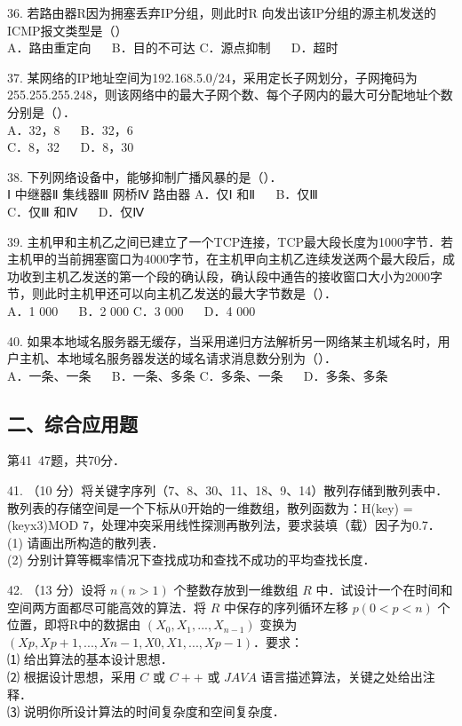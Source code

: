 36. 若路由器R因为拥塞丢弃IP分组，则此时R 向发出该IP分组的源主机发送的ICMP报文类型是（） \\
A．路由重定向 $\quad$ B．目的不可达
C．源点抑制 $\quad$ D．超时

37. 某网络的IP地址空间为192.168.5.0/24，采用定长子网划分，子网掩码为255.255.255.248，则该网络中的最大子网个数、每个子网内的最大可分配地址个数分别是（）．  \\
A．32，8 $\quad$ B．32，6 \\
C．8，32 $\quad$ D．8，30

38. 下列网络设备中，能够抑制广播风暴的是（）． \\
Ⅰ 中继器Ⅱ 集线器Ⅲ 网桥Ⅳ 路由器
A．仅Ⅰ 和Ⅱ $\quad$ B．仅Ⅲ \\
C．仅Ⅲ 和Ⅳ $\quad$ D．仅Ⅳ

39. 主机甲和主机乙之间已建立了一个TCP连接，TCP最大段长度为1000字节．若主机甲的当前拥塞窗口为4000字节，在主机甲向主机乙连续发送两个最大段后，成功收到主机乙发送的第一个段的确认段，确认段中通告的接收窗口大小为2000字节，则此时主机甲还可以向主机乙发送的最大字节数是（）． \\
A．1 000 $\quad$ B．2 000
C．3 000 $\quad$ D．4 000

40. 如果本地域名服务器无缓存，当采用递归方法解析另一网络某主机域名时，用户主机、本地域名服务器发送的域名请求消息数分别为（）． \\
A．一条、一条 $\quad$ B．一条、多条
C．多条、一条 $\quad$ D．多条、多条

\subsection{二、综合应用题}
第41~47题，共70分．

41. （10 分）将关键字序列（7、8、30、11、18、9、14）散列存储到散列表中．散列表的存储空间是一个下标从0开始的一维数组，散列函数为：H(key) = (keyx3)MOD 7，处理冲突采用线性探测再散列法，要求装填（载）因子为0.7． \\
(1) 请画出所构造的散列表．  \\
(2) 分别计算等概率情况下查找成功和查找不成功的平均查找长度．

42. （13 分）设将 $n(n>1)$ 个整数存放到一维数组 $R$ 中．试设计一个在时间和空间两方面都尽可能高效的算法．将 $R$ 中保存的序列循环左移 $p(0<p<n)$ 个位置，即将R中的数据由 $(X_0, X_1, ..., X_{n-1})$ 变换为 $(Xp,Xp+1, ..., Xn-1, X0, X1, ..., Xp-1)$．要求：  \\
⑴ 给出算法的基本设计思想．  \\
⑵ 根据设计思想，采用 $C$ 或 $C++$ 或 $JAVA$ 语言描述算法，关键之处给出注释．  \\
⑶ 说明你所设计算法的时间复杂度和空间复杂度．

